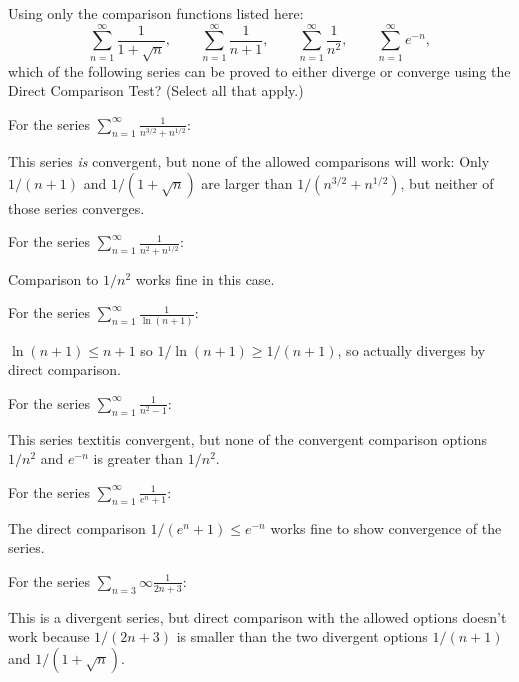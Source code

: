 \documentclass{ximera}
\begin{document}
\begin{exercise}
Using only the comparison functions listed here:
\[ \sum_{n=1}^\infty \frac{1}{1+\sqrt{n}}, \qquad \sum_{n=1}^\infty \frac{1}{n+1},  \qquad \sum_{n=1}^\infty \frac{1}{n^2}, \qquad \sum_{n=1}^\infty e^{-n}, \]
 which of the following series can be proved to either diverge or converge using the Direct Comparison Test? (Select all that apply.)
\begin{selectAll}
\end{selectAll}
\begin{feedback}
For the series {$\displaystyle \sum_{n=1}^\infty \frac{1}{n^{3/2}+n^{1/2}}$}:
\begin{expandable}
This series \textit{is} convergent, but none of the allowed comparisons will work: Only $1/(n+1)$ and $1/(1+\sqrt{n})$ are larger than $1/(n^{3/2}+n^{1/2})$, but neither of those series converges.
\end{expandable}

For the series {$\displaystyle \sum_{n=1}^\infty \frac{1}{n^2 + n^{1/2}}$}:
\begin{expandable}
Comparison to $1/n^2$ works fine in this case.
\end{expandable}

For the series {$\displaystyle \sum_{n=1}^\infty \frac{1}{\ln (n+1)}$}:
\begin{expandable}
$\ln (n+1) \leq n+1$ so $1/\ln (n+1) \geq 1/(n+1)$, so actually diverges by direct comparison.
\end{expandable}

For the series {$\displaystyle \sum_{n=1}^\infty \frac{1}{n^2-1}$}:
\begin{expandable}
This series textit{is} convergent, but none of the convergent comparison options $1/n^2$ and $e^{-n}$ is greater than $1/n^2$.
\end{expandable}

For the series {$\displaystyle \sum_{n=1}^\infty \frac{1}{e^n  + 1}$}:
\begin{expandable}
The direct comparison $1/(e^n + 1) \leq e^{-n}$ works fine to show convergence of the series.
\end{expandable}

For the series {$\displaystyle \sum_{n=3}{\infty} \frac{1}{2n+3}$}:
\begin{expandable}
This is a divergent series, but direct comparison with the allowed options doesn't work because $1/(2n+3)$ is smaller than the two divergent options $1/(n+1)$ and $1/(1+\sqrt{n})$.
\end{expandable}
\end{feedback}
\end{exercise}
\end{document}
